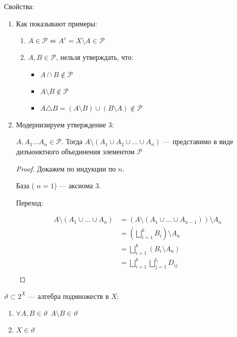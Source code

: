 Свойства:
\begin{enumerate}
    \item Как показывают примеры:
          \begin{enumerate}
              \item \(A\in \mathcal{P} \not \Rightarrow A^c = X\setminus A\in \mathcal{P}\)
              \item \(A, B\in \mathcal{P}\), нельзя утверждать, что:
                    \begin{itemize}
                        \item \(A\cap B\not\in \mathcal{P}\)
                        \item \(A\setminus  B\not\in \mathcal{P}\)
                        \item \(A\triangle  B = (A\setminus B)\cup (B\setminus A)\not\in \mathcal{P}\)
                    \end{itemize}
          \end{enumerate}
    \item Модернизируем утверждение 3:

          \(A, A_1 \dots A_n \in \mathcal{P}\). Тогда \(A\setminus (A_1\cup A_2 \cup \dots \cup A_n)\) --- представимо в виде дизъюнктного объединения элементом \(\mathcal{P}\)

          \begin{proof}
              Докажем по индукции по \(n\).

              База ( \(n = 1\)) --- аксиома 3.

              Переход:

              \begin{align*}
                  A\setminus (A_1\cup \dots \cup A_n) & = (A\setminus (A_1\cup \dots \cup A_{n - 1}))\setminus A_n \\
                                                      & = \left( \bigsqcup_{i = 1}^k B_i \right)\setminus A_n      \\
                                                      & = \bigsqcup_{i = 1}^k (B_i \setminus A_n)                  \\
                                                      & = \bigsqcup_{i = 1}^k \bigsqcup_{j = 1}^{l_i} D_{ij}       \\
              \end{align*}
          \end{proof}
\end{enumerate}

\begin{definition}
    \(\vartheta \subset 2^X\) --- алгебра подмножеств в \(X\):
    \begin{enumerate}
        \item \(\forall A,B\in \vartheta \ \ A\setminus B\in\vartheta\)
        \item \(X\in\vartheta\)
    \end{enumerate}
\end{definition}

